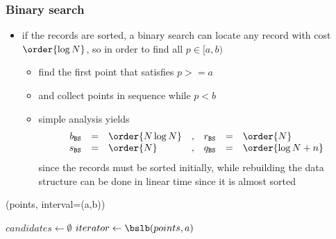 \begin{frame}[fragile]
%
  \frametitle{Binary search}
%
  \begin{itemize}
%
  \item if the records are sorted, a binary search can locate any record with cost $\order{\log
      N}$, so in order to find all $p \in [a,b)$
    \begin{itemize}
    \item find the first point that satisfies $p >= a$
    \item and collect points in sequence while $p < b$
    \item simple analysis yields
      \begin{equation*}
        \begin{array}{rclcrcl}
          b_{{\tt BS}} & = & \order{N \log N} &, &
          r_{{\tt BS}} & = & \order{N} \\
          s_{{\tt BS}} & = & \order{N} &, &
          q_{{\tt BS}} & = & \order{\log N + n}
        \end{array}
      \end{equation*}
      since the records must be sorted initially, while rebuilding the data structure can be
      done in linear time since it is almost sorted
    \end{itemize}
% 
  \end{itemize}
%
  \begin{center}
    \begin{minipage}{.85\linewidth}
      \begin{algorithm}[H]
        \label{alg:rq-bs}
%
        \DontPrintSemicolon
        \SetAlCapHSkip{0ex}
%
        \caption{\rqbs(points, interval=(a,b))}
        \vspace{.5em}
%
        $candidates \leftarrow \emptyset$ \;
        $iterator \leftarrow \bslb(points, a)$ \;
%
      \end{algorithm}
    \end{minipage}
  \end{center}
%
\end{frame}

